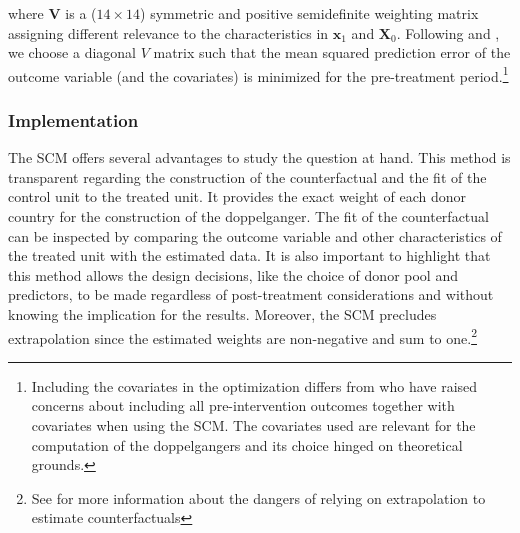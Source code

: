 \documentclass[12pt]{article}
\renewcommand{\vec}[1]{\mathbf{#1}}
\begin{document}
where $\vec{V}$ is a ($14 \times 14$) symmetric and positive semidefinite weighting matrix assigning different relevance to the characteristics in $\vec{x}_1$ and $\vec{X}_0$. Following \cite{Abadie2003} and \cite{Abadie2010}, we choose a diagonal $V$ matrix such that the mean squared prediction error of the outcome variable (and the covariates) is minimized for the pre-treatment period.\footnote{Including the covariates in the optimization differs from \cite{Kaul2018} who have raised concerns about including all pre-intervention outcomes together with covariates when using the SCM. The covariates used are relevant for the computation of the doppelgangers and its choice hinged on theoretical grounds.}



\subsubsection{Implementation \label{SS_Implementation}}

The SCM offers several advantages to study the question at hand. This method is transparent regarding the construction of the counterfactual and the fit of the control unit to the treated unit. It provides the exact weight of each donor country for the construction of the doppelganger. The fit of the counterfactual can be inspected by comparing the outcome variable and other characteristics of the treated unit with the estimated data. It is also important to highlight that this method allows the design decisions, like the choice of donor pool and predictors, to be made regardless of post-treatment considerations and without knowing the implication for the results. Moreover, the SCM precludes extrapolation since the estimated weights are non-negative and sum to one.\footnote{See \cite{King2006} for more information about the dangers of relying on extrapolation to estimate counterfactuals}
\end{document}
